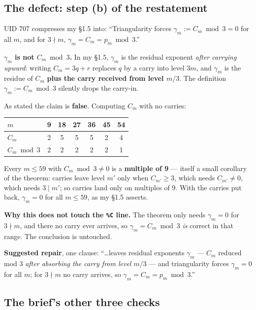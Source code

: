 \documentclass[11pt]{article}
\newcommand{\code}[1]{\texttt{#1}}
\begin{document}
\subsection{The defect: step (b) of the restatement}

UID 707 compresses my \S1.5 into: ``Triangularity forces
$\gamma_m := C_m \bmod 3 = 0$ for all $m$, and for $3\nmid m$,
$\gamma_m = C_m = p_m \bmod 3$.''

\textbf{$\gamma_m$ is not $C_m \bmod 3$.} In my \S1.5, $\gamma_m$ is the residual
exponent \emph{after carrying upward}: writing $C_m = 3q+r$ replaces $q$ by a carry into
level $3m$, and $\gamma_m$ is the residue of $C_m$ \textbf{plus the carry received from
level $m/3$}. The definition $\gamma_m := C_m\bmod 3$ silently drops the carry-in.

As stated the claim is \textbf{false}. Computing $C_m$ with no carries:

\begin{center}
\begin{tabular}{lcccccc}
\toprule
$m$ & 9 & 18 & 27 & 36 & 45 & 54 \\
\midrule
$C_m$ & 2 & 5 & 5 & 5 & 2 & 4 \\
$C_m \bmod 3$ & 2 & 2 & 2 & 2 & 2 & 1 \\
\bottomrule
\end{tabular}
\end{center}

Every $m\le 59$ with $C_m \bmod 3 \ne 0$ is a \textbf{multiple of 9} --- itself a small
corollary of the theorem: carries leave level $m'$ only when $C_{m'}\ge 3$, which needs
$C_{m'}\ne 0$, which needs $3\mid m'$; so carries land only on multiples of 9. With the
carries put back, $\gamma_m = 0$ for all $m\le 59$, as my \S1.5 asserts.

\textbf{Why this does not touch the \code{\%C} line.} The theorem only needs
$\gamma_m = 0$ for $3\nmid m$, and there no carry ever arrives, so
$\gamma_m = C_m \bmod 3$ \emph{is} correct in that range. The conclusion is untouched.

\textbf{Suggested repair}, one clause: ``\ldots leaves residual exponents $\gamma_m$ ---
$C_m$ reduced mod 3 \emph{after absorbing the carry from level $m/3$} --- and
triangularity forces $\gamma_m = 0$ for all $m$; for $3\nmid m$ no carry arrives, so
$\gamma_m = C_m = p_m \bmod 3$.''

\subsection{The brief's other three checks}
\end{document}

